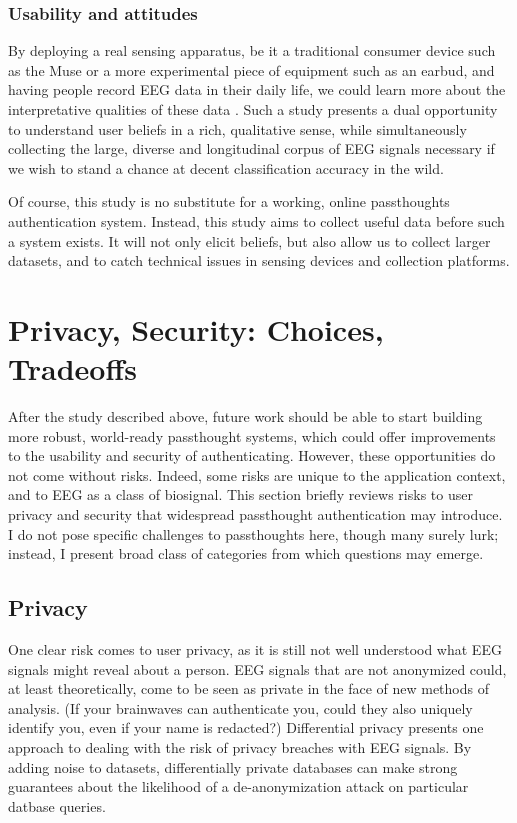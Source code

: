 \documentclass[sigconf]{acmart}
\begin{document}
\subsubsection{Usability and attitudes}
\label{sec:org4421f28}

By deploying a real sensing apparatus, be it a traditional consumer device such as the Muse \cite{Mihajlovic2015} 
or a more experimental piece of equipment such as an earbud,
and having people record EEG data in their daily life, we could learn more about the interpretative qualities of these data \cite{NafusDawn;Sherman2014}.
Such a study presents a dual opportunity to understand user beliefs in a rich, qualitative sense, while simultaneously collecting the large, diverse and longitudinal corpus of EEG signals necessary if we wish to stand a chance at decent classification accuracy in the wild.

Of course, this study is no substitute for a working, online passthoughts authentication system.
Instead, this study aims to collect useful data before such a system exists.
It will not only elicit beliefs, 
but also allow us to collect larger datasets, 
and to catch technical issues in sensing devices and collection platforms.

\section{Privacy, Security: Choices, Tradeoffs}
\label{sec:org05fd2a6}

After the study described above, future work should be able to start building more robust, world-ready passthought systems,
which could offer improvements to the usability and security of authenticating.
However, these opportunities do not come without risks. 
Indeed, some risks are unique to the application context, and to EEG as a class of biosignal. 
This section briefly reviews risks to user privacy and security that widespread passthought authentication may introduce. 
I do not pose specific challenges to passthoughts here, though many surely lurk; instead, I present broad class of categories from which questions may emerge. 

\subsection{Privacy}
\label{sec:org665d86b}
One clear risk comes to user privacy, as it is still not well understood what EEG signals might reveal about a person.
EEG signals that are not anonymized could, at least theoretically, come to be seen as private in the face of new methods of analysis.
(If your brainwaves can authenticate you, could they also uniquely identify you, even if your name is redacted?)
Differential privacy \cite{Dwork2014} presents one approach to dealing with the risk of privacy breaches with EEG signals.
By adding noise to datasets, differentially private databases can make strong guarantees about the likelihood of a de-anonymization attack on particular datbase queries.
\end{document}
